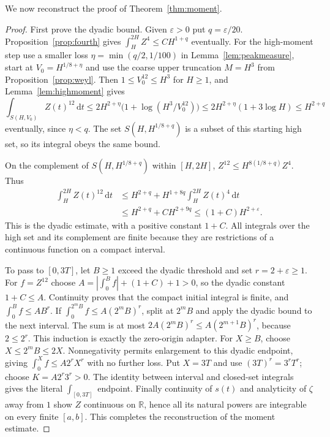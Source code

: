 \documentclass[11pt,a4paper]{article}
\numberwithin{equation}{section}
\theoremstyle{definition}
\newcommand{\R}{\mathbb R}
\newcommand{\dd}{\,\mathrm d}
\newcommand{\zabs}{Z}
\begin{document}
\par\noindent We now reconstruct the proof of Theorem~\ref{thm:moment}.
\begin{proof}
First prove the dyadic bound. Given $\varepsilon>0$ put $q=\varepsilon/20$.
Proposition~\ref{prop:fourth} gives
$\int_H^{2H}\zabs^4\le C H^{1+q}$ eventually.
For the high-moment step use a smaller loss
$\eta=\min(q/2,1/100)$ in Lemma~\ref{lem:peakmeasure}, start at
$V_0=H^{1/8+\eta}$ and use the coarse upper truncation
$M=H^3$ from Proposition~\ref{prop:weyl}. Then
$1\le V_0^{12}\le H^3$ for $H\ge1$, and Lemma~\ref{lem:highmoment} gives
\[
 \int_{S(H,V_0)}\zabs(t)^{12}\dd t
 \le2H^{2+\eta}\bigl(1+\log(H^3/V_0^{12})\bigr)
 \le2H^{2+\eta}(1+3\log H)\le H^{2+q}
\]
eventually, since $\eta<q$. The set
$S(H,H^{1/8+q})$ is a subset of this starting high set, so its integral
obeys the same bound.

On the complement of $S(H,H^{1/8+q})$ within $[H,2H]$,
$\zabs^{12}\le H^{8(1/8+q)}\zabs^4$. Thus
\begin{align*}
 \int_H^{2H}\zabs(t)^{12}\dd t
 &\le H^{2+q}+H^{1+8q}\int_H^{2H}\zabs(t)^4\dd t\\
 &\le H^{2+q}+C H^{2+9q}
 \le(1+C)H^{2+\varepsilon}.
\end{align*}
This is the dyadic estimate, with a positive constant $1+C$.
All integrals over the high set and its complement are finite because they
are restrictions of a continuous function on a compact interval.

To pass to $[0,3T]$, let $B\ge1$ exceed the dyadic threshold and set
$r=2+\varepsilon\ge1$. For $f=\zabs^{12}$ choose
$A=|\int_0^Bf|+(1+C)+1>0$, so the dyadic constant $1+C\le A$.
Continuity proves that the compact initial integral is finite, and
$\int_0^Bf\le AB^r$. If
$\int_0^{2^mB}f\le A(2^mB)^r$, split at $2^mB$ and apply the dyadic
bound to the next interval. The sum is at most
$2A(2^mB)^r\le A(2^{m+1}B)^r$, because $2\le2^r$.
This induction is exactly the zero-origin adapter.
For $X\ge B$, choose $X\le2^mB\le2X$. Nonnegativity permits enlargement
to this dyadic endpoint, giving $\int_0^Xf\le A2^rX^r$ with no further loss.
Put $X=3T$ and use $(3T)^r=3^rT^r$; choose $K=A2^r3^r>0$.
The identity between interval and closed-set integrals gives the literal
$\int_{[0,3T]}$ endpoint. Finally continuity of $s(t)$ and analyticity of
$\zeta$ away from $1$ show $\zabs$ continuous on $\R$, hence all its natural
powers are integrable on every finite $[a,b]$. This completes the
reconstruction of the moment estimate.
\end{proof}
\end{document}
